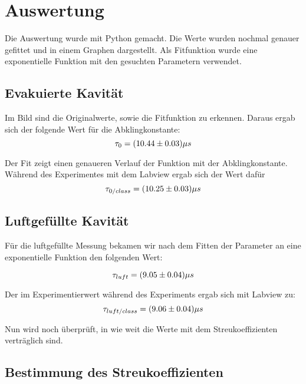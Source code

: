 \section{Auswertung}

Die Auswertung wurde mit Python gemacht. Die Werte wurden nochmal genauer gefittet und in einem Graphen dargestellt. Als Fitfunktion wurde eine exponentielle Funktion mit den gesuchten Parametern verwendet. 

\subsection{Evakuierte Kavität}


Im Bild sind die Originalwerte, sowie die Fitfunktion zu erkennen. Daraus ergab sich der folgende Wert für die Abklingkonstante:
\begin{equation}
\notag
\tau_{0}= (10.44 \pm 0.03)\mu s
\end{equation}

Der Fit zeigt einen genaueren Verlauf der Funktion mit der Abklingkonstante. Während des Experimentes mit dem Labview ergab sich der Wert dafür 
\begin{equation}
\notag
\tau_{0/class}= (10.25 \pm 0.03)\mu s
\end{equation}

\subsection{Luftgefüllte Kavität}


Für die luftgefüllte Messung bekamen wir nach dem Fitten der Parameter an eine exponentielle Funktion den folgenden Wert:

\begin{equation}
\notag
\tau_{luft}= (9.05 \pm 0.04)\mu s
\end{equation}

Der im Experimentierwert während des Experiments ergab sich mit Labview zu:
\begin{equation}
\notag
\tau_{luft/class}= (9.06 \pm 0.04)\mu s
\end{equation}

Nun wird noch überprüft, in wie weit die Werte mit dem Streukoeffizienten verträglich sind.

\subsection{Bestimmung des Streukoeffizienten}

